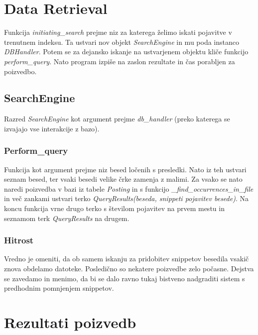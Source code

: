 \documentclass[runningheads]{llncs}
\begin{document}
\section{Data Retrieval}
Funkcija \textit{initiating\_search} prejme niz za katerega želimo iskati pojavitve v trenutnem indeksu.
Ta ustvari nov objekt \textit{SearchEngine} in mu poda instanco \textit{DBHandler}. Potem se za dejansko iskanje na ustvarjenem objektu kliče funkcijo \textit{perform\_query}. Nato program izpiše na zaslon rezultate in čas porabljen za poizvedbo.

\subsection{SearchEngine}
Razred \textit{SearchEngine} kot argument prejme \textit{db\_handler} (preko katerega se izvajajo vse interakcije z bazo).

\subsubsection{Perform\_query}
Funkcija kot argument prejme niz besed ločenih s presledki. Nato iz teh ustvari seznam besed, ter vsaki besedi velike črke zamenja z malimi. Za vsako se nato naredi poizvedba v bazi iz tabele \textit{Posting} in s funkcijo \textit{\_find\_occurrences\_in\_file} in več zankami ustvari terko \textit{QueryResults(beseda, snippeti pojavitev besede)}. Na koncu funkcija vrne drugo terko s številom pojavitev na prvem mestu in seznamom terk \textit{QueryResults} na drugem.

\subsubsection{Hitrost}
Vredno je omeniti, da ob samem iskanju za pridobitev snippetov besedila vsakič znova obdelamo datoteke. Posledično so nekatere poizvedbe zelo počasne. Dejstva se zavedamo in menimo, da bi se dalo ravno tukaj bistveno nadgraditi sistem s predhodnim pomnjenjem snippetov.

\section{Rezultati poizvedb}
\end{document}
